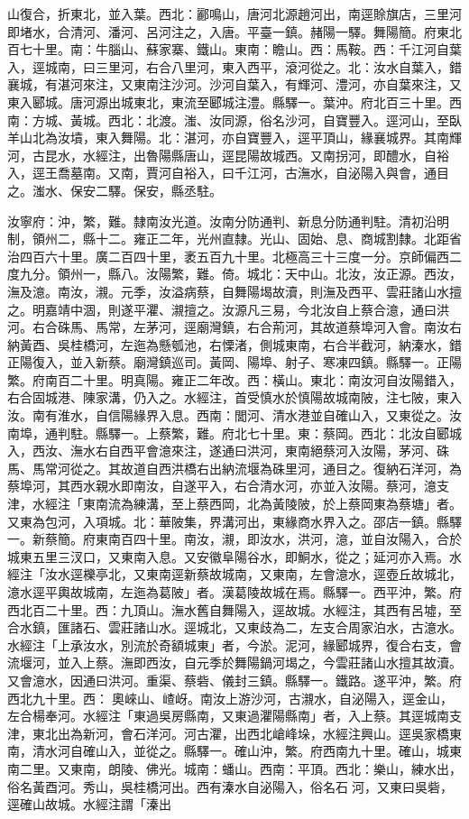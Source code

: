 \begin{pinyinscope}
山復合，折東北，並入葉。西北：酈鳴山，唐河北源趙河出，南逕賒旗店，三里河即堵水，合清河、潘河、呂河注之，入唐。平臺一鎮。赭陽一驛。舞陽簡。府東北百七十里。南：牛腦山、蘇家寨、鐵山。東南：瞻山。西：馬鞍。西：千江河自葉入，逕城南，曰三里河，右合八里河，東入西平，滾河從之。北：汝水自葉入，錯襄城，有湛河來注，又東南注沙河。沙河自葉入，有輝河、澧河，亦自葉來注，又東入郾城。唐河源出城東北，東流至郾城注澧。縣驛一。葉沖。府北百三十里。西南：方城、黃城。西北：北渡。滍、汝同源，俗名沙河，自寶豐入。逕河山，至臥羊山北為汝墳，東入舞陽。北：湛河，亦自寶豐入，逕平頂山，緣襄城界。其南輝河，古昆水，水經注，出魯陽縣唐山，逕昆陽故城西。又南拐河，即醴水，自裕入，逕王喬墓南。又南，賈河自裕入，曰千江河，古潕水，自泌陽入與會，通目之。滍水、保安二驛。保安，縣丞駐。

汝寧府：沖，繁，難。隸南汝光道。汝南分防通判、新息分防通判駐。清初沿明制，領州二，縣十二。雍正二年，光州直隸。光山、固始、息、商城割隸。北距省治四百六十里。廣二百四十里，袤五百九十里。北極高三十三度一分。京師偏西二度九分。領州一，縣八。汝陽繁，難。倚。城北：天中山。北汝，汝正源。西汝，潕及澺。南汝，瀙。元季，汝溢病蔡，自舞陽堨故瀆，則潕及西平、雲莊諸山水擅之。明嘉靖中涸，則遂平灈、瀙擅之。汝源凡三易，今北汝自上蔡合澺，通曰洪河。右合硃馬、馬常，左茅河，逕廟灣鎮，右合荊河，其故道蔡埠河入會。南汝右納黃酉、吳桂橋河，左迤為懸瓠池，右慄渚，側城東南，右合半截河，納溱水，錯正陽復入，並入新蔡。廟灣鎮巡司。黃岡、陽埠、射子、寒凍四鎮。縣驛一。正陽繁。府南百二十里。明真陽。雍正二年改。西：橫山。東北：南汝河自汝陽錯入，右合固城港、陳家溝，仍入之。水經注，首受慎水於慎陽故城南陂，注七陂，東入汝。南有淮水，自信陽緣界入息。西南：閭河、清水港並自確山入，又東從之。汝南埠，通判駐。縣驛一。上蔡繁，難。府北七十里。東：蔡岡。西北：北汝自郾城入，西汝、潕水右自西平會澺來注，遂通曰洪河，東南絕蔡河入汝陽，茅河、硃馬、馬常河從之。其故道自西洪橋右出納流堰為硃里河，通目之。復納石洋河，為蔡埠河，其西水親水即南汝，自遂平入，右合清水河，亦並入汝陽。蔡河，澺支津，水經注「東南流為練溝，至上蔡西岡，北為黃陵陂，於上蔡岡東為蔡塘」者。又東為包河，入項城。北：華陂集，界溝河出，東緣商水界入之。邵店一鎮。縣驛一。新蔡簡。府東南百四十里。南汝，瀙，即汝水，洪河，澺，並自汝陽入，合於城東五里三汊口，又東南入息。又安徽阜陽谷水，即鮦水，從之；延河亦入焉。水經注「汝水逕櫟亭北，又東南逕新蔡故城南，又東南，左會澺水，逕壺丘故城北，澺水逕平輿故城南，左迤為葛陂」者。漢葛陵故城在焉。縣驛一。西平沖，繁。府西北百二十里。西：九頂山。潕水舊自舞陽入，逕故城。水經注，其西有呂墟，至合水鎮，匯諸石、雲莊諸山水。逕城北，又東歧為二，左支合周家泊水，古澺水。水經注「上承汝水，別流於奇額城東」者，今淤。泥河，緣郾城界，復合右支，會流堰河，並入上蔡。潕即西汝，自元季於舞陽鍋河堨之，今雲莊諸山水擅其故瀆。又會澺水，因通曰洪河。重渠、蔡砦、儀封三鎮。縣驛一。鐵路。遂平沖，繁。府西北九十里。西：奧崍山、嵖岈。南汝上游沙河，古瀙水，自泌陽入，逕金山，左合楊奉河。水經注「東過吳房縣南，又東過灈陽縣南」者，入上蔡。其逕城南支津，東北出為新河，會石洋河。河古灈，出西北嵢峰垛，水經注興山。逕吳家橋東南，清水河自確山入，並從之。縣驛一。確山沖，繁。府西南九十里。確山，城東南二里。又東南，朗陵、佛光。城南：蟠山。西南：平頂。西北：樂山，練水出，俗名黃酉河。秀山，吳桂橋河出。西有溱水自泌陽入，俗名石河，又東曰吳砦，逕確山故城。水經注謂「溱出
\end{pinyinscope}
